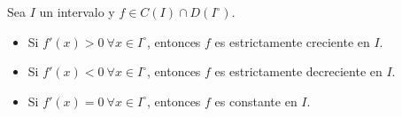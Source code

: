 \documentclass[12pt]{article}
\begin{document}
\begin{ejercicio}
    \begin{coro} Sea \( I \) un intervalo y \( f \in C(I) \cap D(I^\circ) \).
    \begin{itemize}
        \item Si \( f'(x) > 0 \ \forall x \in I^\circ \), entonces \( f \) es estrictamente creciente en \( I \).
        \item Si \( f'(x) < 0 \ \forall x \in I^\circ \), entonces \( f \) es estrictamente decreciente en \( I \).
        \item Si \( f'(x) = 0 \ \forall x \in I^\circ \), entonces \( f \) es constante en \( I \).
    \end{itemize}
    \end{coro}
    
\end{ejercicio}
\newpage
\end{document}
